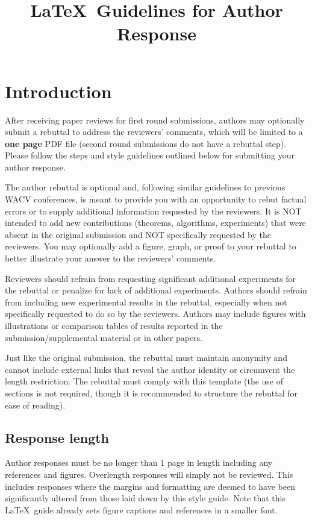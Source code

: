 \documentclass[10pt,twocolumn,letterpaper]{article}
\begin{document}
\title{\LaTeX\ Guidelines for Author Response}  %

\maketitle
\thispagestyle{empty}
\appendix

\section{Introduction}

After receiving paper reviews for first round submissions, authors may optionally submit a rebuttal to address the reviewers' comments, which will be limited to a {\bf one page} PDF file (second round submissions do not have a rebuttal step). 
Please follow the steps and style guidelines outlined below for submitting your author response.

The author rebuttal is optional and, following similar guidelines to previous WACV conferences, is meant to provide you with an opportunity to rebut factual errors or to supply additional information requested by the reviewers.
It is NOT intended to add new contributions (theorems, algorithms, experiments) that were absent in the original submission and NOT specifically requested by the reviewers.
You may optionally add a figure, graph, or proof to your rebuttal to better illustrate your answer to the reviewers' comments.

Reviewers should refrain from requesting significant additional experiments for the rebuttal or penalize for lack of additional experiments.
Authors should refrain from including new experimental results in the rebuttal, especially when not specifically requested to do so by the reviewers.
Authors may include figures with illustrations or comparison tables of results reported in the submission/supplemental material or in other papers.

Just like the original submission, the rebuttal must maintain anonymity and cannot include external links that reveal the author identity or circumvent the length restriction.
The rebuttal must comply with this template (the use of sections is not required, though it is recommended to structure the rebuttal for ease of reading).


\subsection{Response length}
Author responses must be no longer than 1 page in length including any references and figures.
Overlength responses will simply not be reviewed.
This includes responses where the margins and formatting are deemed to have been significantly altered from those laid down by this style guide.
Note that this \LaTeX\ guide already sets figure captions and references in a smaller font.
\end{document}
